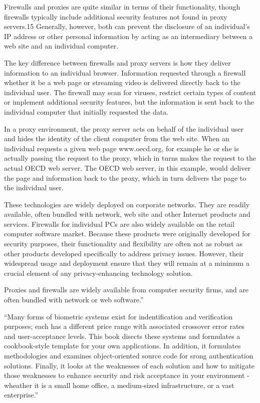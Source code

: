 Firewalls and proxies are quite similar in terms of their functionality, though firewalls typically include additional security features not found in proxy servers.15 Generally, however, both can prevent the disclosure of an individual's IP address or other personal information by acting as an intermediary between a web site and an individual computer.

The key difference between firewalls and proxy servers is how they deliver information to an individual browser. Information requested through a firewall  whether it be a web page or streaming video is delivered directly back to the individual user. The firewall may scan for viruses, restrict certain types of content or implement additional security features, but the information is sent back to the individual computer that initially requested the data.

In a proxy environment, the proxy server acts on behalf of the individual user and hides the identity of the client computer from the web site. When an individual requests a given web page  www.oecd.org, for example  he or she is actually passing the request to the proxy, which in turns makes the request to the actual OECD web server. The OECD web server, in this example, would deliver the page and information back to the proxy, which in turn delivers the page to the individual user.

These technologies are widely deployed on corporate networks. They are readily available, often bundled with network, web site and other Internet products and services. Firewalls for individual PCs are also widely available on the retail computer software market. Because these products were originally developed for security purposes, their functionality and flexibility are often not as robust as other products developed specifically to address privacy issues. However, their widespread usage and deployment ensure that they will remain at a minimum a crucial element of any privacy-enhancing technology solution.

Proxies and firewalls are widely available from computer security firms, and are often bundled with network or web software.''\cite{oecd}



``Many forms of biometric systems exist for indentification and verification purposes; each has a different price range with associated crossover error rates and user-acceptance levels. This book disects these systems and formulates a cookbook-style template for your own applications. In addition, it formulates methodologies and examines object-oriented source code for srong authentication solutions. Finally, it looks at the weaknesses of each solution and how to mitigate those weaknesses to enhance security and risk acceptance in your environment - wheather it is a small home office, a medium-sized infrastructure, or a vast enterprise.''\cite{chirillo}

\nocite{*}

\bye

